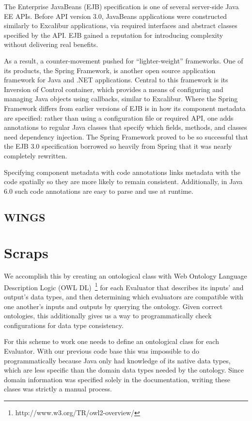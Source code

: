 \documentclass{elsart}
\begin{document}
The Enterprise JavaBeans (EJB) specification is one of several server-side
Java EE APIs.  Before API version 3.0, JavaBeans applications were
constructed similarly to Excalibur applications, via required interfaces
and abstract classes specified by the API.  EJB gained a reputation for
introducing complexity without delivering real benefits.

As a result, a counter-movement pushed for ``lighter-weight'' frameworks.
One of its products, the Spring Framework, is another open source
application framework for Java and .NET applications.  Central to
this framework is its Inversion of Control container, which provides
a means of configuring and managing Java objects using callbacks,
similar to Excalibur.  Where the Spring Framework differs from earlier
versions of EJB is in how its component metadata are specified: rather
than using a configuration file or required API, one adds annotations to
regular Java classes that specify which fields, methods, and classes need
dependency injection.  The Spring Framework proved to be so successful
that the EJB 3.0 specification borrowed so heavily from Spring that it
was nearly completely rewritten.

Specifying component metadata with code annotations links metadata
with the code spatially so they are more likely to remain consistent.
Additionally, in Java 6.0 such code annotations are easy to parse and
use at runtime.

\subsection{WINGS}

\section{Scraps}  %

We accomplish this by creating an ontological class with Web Ontology Language Description Logic (OWL DL)~\footnote{http://www.w3.org/TR/owl2-overview/} for each Evaluator that describes its inputs' and output's data types, and then determining which evaluators are compatible with one another's inputs and outputs by querying the ontology.  Given correct ontologies, this additionally gives us a way to programmatically check configurations for data type consistency.

For this scheme to work one needs to define an ontological class for each Evaluator.  With our previous code base this was impossible to do programmatically because Java only had knowledge of its native data types, which are less specific than the domain data types needed by the ontology.  Since domain information was specified solely in the documentation, writing these clases was strictly a manual process.
\end{document}
